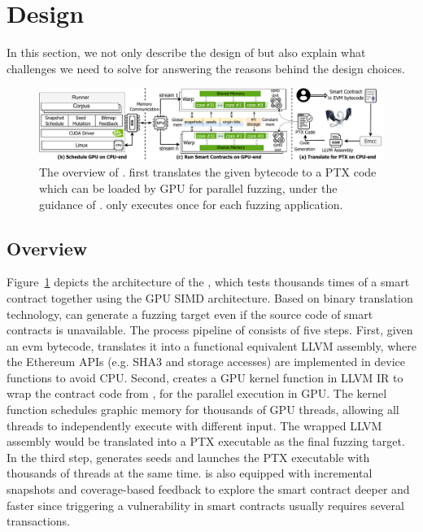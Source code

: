 \section{Design}
In this section, we not only describe the design of  {\tool} but also explain what challenges we need to solve for answering the reasons behind the design choices.  

\begin{figure}[t]
\centerline{\includegraphics[width=\textwidth]{images/GFL-overview.drawio.pdf}}
\caption{The overview of {\tool}. {\translator} first translates the given bytecode to a PTX code which can be loaded by GPU for parallel fuzzing, under the guidance of {\runner}. {\translator} only executes once for each fuzzing application.}
\vspace{-0.1in}
\label{fig:overview}
\end{figure}


\subsection{Overview}
Figure~\ref{fig:overview} depicts the architecture of the {\tool}, which tests thousands times of a smart contract together using the GPU SIMD architecture.
Based on binary translation technology, {\tool} can generate a fuzzing target even if the source code of smart contracts is unavailable.
%
The process pipeline of {\tool} consists of five steps. 
%
First, given an evm bytecode, {\translator} translates it into a functional equivalent LLVM assembly, where the Ethereum APIs (e.g. SHA3 and storage accesses) are implemented in device functions to avoid CPU.
%
Second, {\wrapper} creates a GPU kernel function in LLVM IR to wrap the contract code from {\translator}, for the parallel execution in GPU. The kernel function schedules graphic memory for thousands of GPU threads, allowing all threads to independently execute with different input. The wrapped LLVM assembly would be translated into a PTX executable as the final fuzzing target. 
%
In the third step, {\runner} generates seeds and launches the PTX executable with thousands of threads at the same time. {\runner} is also equipped with incremental snapshots and coverage-based feedback to explore the smart contract deeper and faster since triggering a vulnerability in smart contracts usually requires several transactions\cite{TBD}. 

